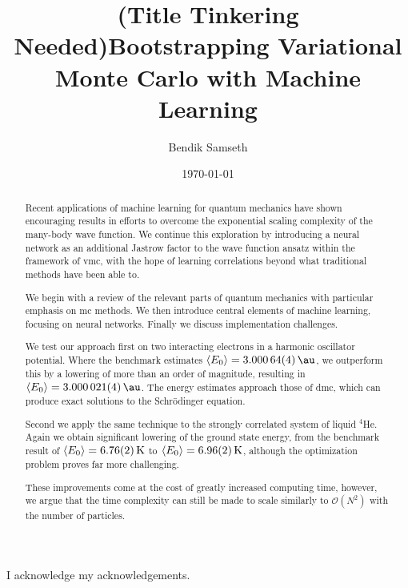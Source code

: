 \documentclass[twoside,english]{uiofysmaster}
\author{Bendik Samseth}
\title{(Title Tinkering Needed)Bootstrapping Variational Monte Carlo with Machine Learning}
\date{\monthyeardate\today}
\begin{document}
\maketitle

\begin{abstract}
Recent applications of machine learning for quantum mechanics have shown
encouraging results in efforts to overcome the exponential scaling complexity of
the many-body wave function. We continue this exploration by introducing a
neural network as an additional Jastrow factor to the wave function ansatz
within the framework of \acrlong{vmc}, with the hope of learning
correlations beyond what traditional methods have been able to.

We begin with a review of the relevant parts of quantum mechanics with particular
emphasis on \acrlong{mc} methods. We then introduce central elements of machine
learning, focusing on neural networks. Finally we discuss implementation
challenges.

We test our approach first on two interacting electrons in a harmonic oscillator
potential. Where the benchmark estimates $\expval{E_0}=\SI{3.00064(4)}{\au}$, we
outperform this by a lowering of more than an order of magnitude, resulting in
$\expval{E_0}=\SI{3.000021(4)}{\au}$. The energy estimates approach those of
\acrlong{dmc}, which can produce exact solutions to the Schrödinger equation.

Second we apply the same technique to the strongly correlated system of liquid
$^4$He. Again we obtain significant lowering of the ground state energy, from
the benchmark result of $\expval{E_0}=\SI{6.76(2)}{\kelvin}$ to
$\expval{E_0}=\SI{6.96(2)}{\kelvin}$, although the optimization problem proves far
more challenging.

These improvements come at the cost of greatly increased computing time,
however, we argue that the time complexity can still be made to scale similarly to
$\mathcal{O}(N^2)$ with the number of particles.
\end{abstract}

\glsresetall   %

\begin{acknowledgements}
  I acknowledge my acknowledgements.
\end{acknowledgements}

\tableofcontents

\listoffigures
\begingroup
\let\clearpage\relax
\listoftables
\endgroup
\end{document}
